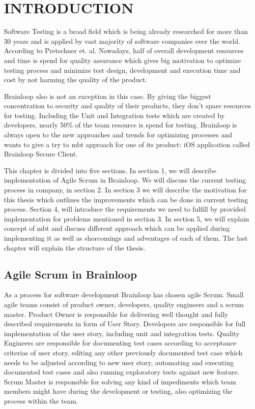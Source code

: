 \chapter{INTRODUCTION}
\label{chapter:introduction}

Software Testing is a broad field which is being already researched for more than 30 years and is applied by vast majority of software companies over the world. According to Pretschner et. al. Nowadays, half of overall development resources and time is spend for quality assurance which gives big motivation to optimize testing process and minimize test design, development and execution time and cost by not harming the quality of the product.

Brainloop also is not an exception in this case. By giving the biggest concentration to security and quality of their products, they don't spare resources for testing. Including the Unit and Integration tests which are created by developers, nearly 50\% of the team resource is spend for testing. Brainloop is always open to the new approaches and trends for optimizing processes and wants to give a try to \acrlong{mbt} approach for one of its product: iOS application called Brainloop Secure Client.

This chapter is divided into five sections. In section 1, we will describe implementation of Agile Scrum in Brainloop. We will discuss the current testing process in company, in section 2. In section 3 we will describe the motivation for this thesis which outlines the improvements which can be done in current testing process. Section 4, will introduce the requirements we need to fulfill by provided implementation for problems mentioned in section 3. In section 5, we will explain concept of \acrlong{mbt} and discuss different approach which can be applied during implementing it as well as shorcomings and adventages of each of them. The last chapter will explain the structure of the thesis.

\section{Agile Scrum in Brainloop}

As a process for software development Brainloop has chosen agile Scrum. Small agile teams consist of product owner, developers, quality engineers and a scrum master. Product Owner is responsible for delivering well thought and fully described requirements in form of User Story. Developers are responsible for full implementation of the user story, including unit and integration tests. Quality Engineers are responsible for documenting test cases according to acceptance criterias of user story, editing any other previously documented test case which needs to be adjusted according to new user story, automating and executing documented test cases and also running exploratory tests against new feature. Scrum Master is responsible for solving any kind of impediments which team members might have during the development or testing, also optimizing the process within the team.


